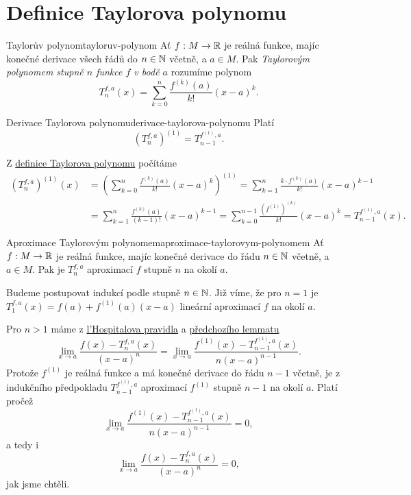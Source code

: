 \section{Definice Taylorova polynomu}
\label{sec:definice-taylorova-polynomu}

\begin{definition}{Taylorův polynom}{tayloruv-polynom}
 Ať $f:M \to \mathbb{R}$ je reálná funkce, majíc konečné derivace všech řádů do $n \in
 \mathbb{N}$ včetně, a $a \in M$. Pak \emph{Taylorovým polynomem stupně $n$ funkce $f$ v
 bodě $a$} rozumíme polynom
 \[
  T^{f,a}_n(x) = \sum_{k=0}^{n} \frac{f^{(k)}(a)}{k!}(x-a)^{k}.
 \]
\end{definition}

\begin{lemma}{Derivace Taylorova polynomu}{derivace-taylorova-polynomu}
 Platí
 \[
  (T^{f,a}_n)^{(1)} = T^{f^{(1)},a}_{n-1}.
 \]
\end{lemma}
\begin{lemproof}
 Z \hyperref[def:tayloruv-polynom]{definice Taylorova polynomu} počítáme
 \begin{align*}
  (T^{f,a}_n)^{(1)}(x) &= \left( \sum_{k=0}^n \frac{f^{(k)}(a)}{k!}(x-a)^{k}
  \right)^{(1)} = \sum_{k=1}^n \frac{k \cdot f^{(k)}(a)}{k!}(x-a)^{k-1}\\
                       &= \sum_{k=1}^{n} \frac{f^{(k)}(a)}{(k-1)!}(x-a)^{k-1}
                       = \sum_{k=0}^{n-1} \frac{(f^{(1)})^{(k)}}{k!}(x-a)^{k} =
                       T^{f^{(1)},a}_{n-1}(x).
 \end{align*}
\end{lemproof}

\begin{proposition}{Aproximace Taylorovým polynomem}{aproximace-taylorovym-polynomem}
 Ať $f:M \to \mathbb{R}$ je reálná funkce, majíc konečné derivace do řádu $n \in \mathbb{N}$
 včetně, a $a \in M$. Pak je $T^{f,a}_n$ aproximací $f$ stupně $n$ na okolí $a$.
\end{proposition}
\begin{propproof}
 Budeme postupovat indukcí podle stupně $n \in \mathbb{N}$. Již víme, že pro $n = 1$ je
 $T^{f,a}_1(x) = f(a) + f^{(1)}(a)(x-a)$ lineární aproximací $f$ na okolí $a$.

 Pro $n > 1$ máme z \hyperref[thm:lhospitalovo-pravidlo]{l'Hospitalova pravidla}
 a \hyperref[lem:derivace-taylorova-polynomu]{předchozího lemmatu}
 \[
  \lim_{x \to a} \frac{f(x) - T^{f,a}_n(x)}{(x-a)^{n}} = \lim_{x \to a}
  \frac{f^{(1)}(x) - T^{f^{(1)},a}_{n-1}(x)}{n(x-a)^{n-1}}.
 \]
 Protože $f^{(1)}$ je reálná funkce a má konečné derivace do řádu $n-1$ včetně,
 je z indukčního předpokladu $T^{f^{(1)},a}_{n-1}$ aproximací $f^{(1)}$ stupně
 $n-1$ na okolí $a$. Platí pročež
 \[
  \lim_{x \to a} \frac{f^{(1)}(x) - T^{f^{(1)},a}_{n-1}(x)}{n(x-a)^{n-1}} = 0,
 \]
 a tedy i
 \[
  \lim_{x \to a} \frac{f(x) - T^{f,a}_n(x)}{(x-a)^{n}} = 0,
 \]
 jak jsme chtěli.
\end{propproof}

